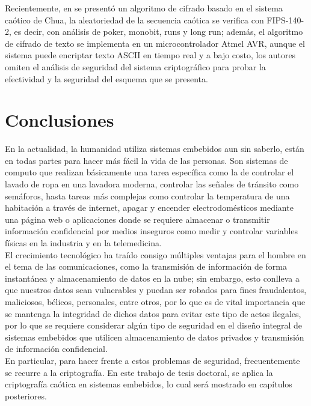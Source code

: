 Recientemente, en \cite{AyV_2014} se presentó un algoritmo de cifrado basado en el sistema caótico de Chua, la aleatoriedad de la secuencia caótica se verifica con FIPS-140-2, es decir, con análisis de poker, monobit, runs y long run; además, el algoritmo de cifrado de texto se implementa en un microcontrolador Atmel AVR, aunque el sistema puede encriptar texto ASCII en tiempo real y a bajo costo, los autores omiten el análisis de seguridad del sistema criptográfico para probar la efectividad y la seguridad del esquema que se presenta.

\section{Conclusiones}
En la actualidad, la humanidad utiliza sistemas embebidos aun sin saberlo, están en todas partes para hacer más fácil la vida de las personas. Son sistemas de computo que realizan básicamente una tarea específica como la de controlar el lavado de ropa en una lavadora moderna, controlar las señales de tránsito como semáforos, hasta tareas más complejas como controlar la temperatura de una habitación a través de internet, apagar y encender electrodomésticos mediante una página web o aplicaciones donde se requiere almacenar o transmitir información confidencial por medios inseguros como medir y controlar variables físicas en la industria y en la telemedicina. \\

El crecimiento tecnológico ha traído consigo múltiples ventajas para el hombre en el tema de las comunicaciones, como la transmisión de información de forma instantánea y almacenamiento de datos en la nube; sin embargo, esto conlleva a que nuestros datos sean vulnerables y puedan ser robados para fines fraudalentos, maliciosos, bélicos, personales, entre otros, por lo que es de vital importancia que se mantenga la integridad de dichos datos para evitar este tipo de actos ilegales, por lo que se requiere considerar algún tipo de seguridad en el diseño integral de sistemas embebidos que utilicen almacenamiento de datos privados y transmisión de información confidencial. \\

En particular, para hacer frente a estos problemas de seguridad, frecuentemente se recurre a la criptografía. En este trabajo de tesis doctoral, se aplica la criptografía caótica en sistemas embebidos, lo cual será mostrado en capítulos posteriores.   
   

